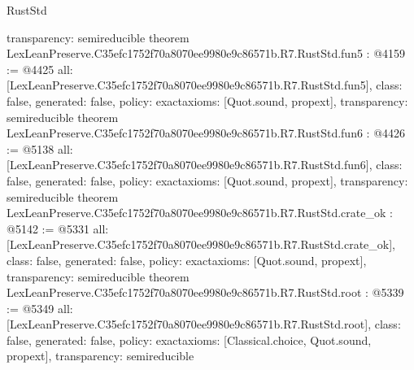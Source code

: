 \begin{lexlean}{RustStd}
\begin{coremodule}
{  transparency: semireducible
}
theorem LexLeanPreserve.C35efc1752f70a8070ee9980e9c86571b.R7.RustStd.fun5 : @4159 := @4425 {
  all: [LexLeanPreserve.C35efc1752f70a8070ee9980e9c86571b.R7.RustStd.fun5],
  class: false,
  generated: false,
  policy: exact{axioms: [Quot.sound, propext]},
  transparency: semireducible
}
theorem LexLeanPreserve.C35efc1752f70a8070ee9980e9c86571b.R7.RustStd.fun6 : @4426 := @5138 {
  all: [LexLeanPreserve.C35efc1752f70a8070ee9980e9c86571b.R7.RustStd.fun6],
  class: false,
  generated: false,
  policy: exact{axioms: [Quot.sound, propext]},
  transparency: semireducible
}
theorem LexLeanPreserve.C35efc1752f70a8070ee9980e9c86571b.R7.RustStd.crate_ok : @5142 := @5331 {
  all: [LexLeanPreserve.C35efc1752f70a8070ee9980e9c86571b.R7.RustStd.crate_ok],
  class: false,
  generated: false,
  policy: exact{axioms: [Quot.sound, propext]},
  transparency: semireducible
}
theorem LexLeanPreserve.C35efc1752f70a8070ee9980e9c86571b.R7.RustStd.root : @5339 := @5349 {
  all: [LexLeanPreserve.C35efc1752f70a8070ee9980e9c86571b.R7.RustStd.root],
  class: false,
  generated: false,
  policy: exact{axioms: [Classical.choice, Quot.sound, propext]},
  transparency: semireducible
}


\end{coremodule}
\end{lexlean}
